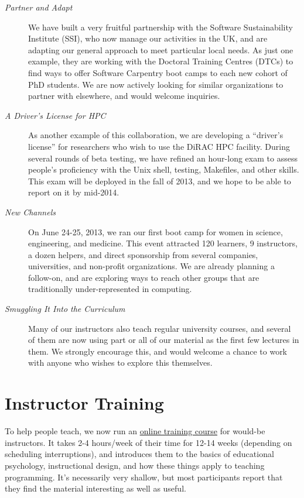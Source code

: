 \documentclass{article}
\begin{document}
\begin{description}
\item[\emph{Partner and Adapt}]
We have built a very fruitful partnership with the Software
Sustainability Institute (SSI), who now manage our activities in the UK,
and are adapting our general approach to meet particular local needs. As
just one example, they are working with the Doctoral Training Centres
(DTCs) to find ways to offer Software Carpentry boot camps to each new
cohort of PhD students. We are now actively looking for similar
organizations to partner with elsewhere, and would welcome inquiries.
\item[\emph{A Driver's License for HPC}]
As another example of this collaboration, we are developing a ``driver's
license'' for researchers who wish to use the DiRAC HPC facility. During
several rounds of beta testing, we have refined an hour-long exam to
assess people's proficiency with the Unix shell, testing, Makefiles, and
other skills. This exam will be deployed in the fall of 2013, and we
hope to be able to report on it by mid-2014.
\item[\emph{New Channels}]
On June 24-25, 2013, we ran our first boot camp for women in science,
engineering, and medicine. This event attracted 120 learners, 9
instructors, a dozen helpers, and direct sponsorship from several
companies, universities, and non-profit organizations. We are already
planning a follow-on, and are exploring ways to reach other groups that
are traditionally under-represented in computing.
\item[\emph{Smuggling It Into the Curriculum}]
Many of our instructors also teach regular university courses, and
several of them are now using part or all of our material as the first
few lectures in them. We strongly encourage this, and would welcome a
chance to work with anyone who wishes to explore this themselves.
\end{description}

\section{Instructor Training}

To help people teach, we now run an
\href{http://teaching.software-carpentry.org}{online training course}
for would-be instructors. It takes 2-4 hours/week of their time for
12-14 weeks (depending on scheduling interruptions), and introduces them
to the basics of educational psychology, instructional design, and how
these things apply to teaching programming. It's necessarily very
shallow, but most participants report that they find the material
interesting as well as useful.
\end{document}
